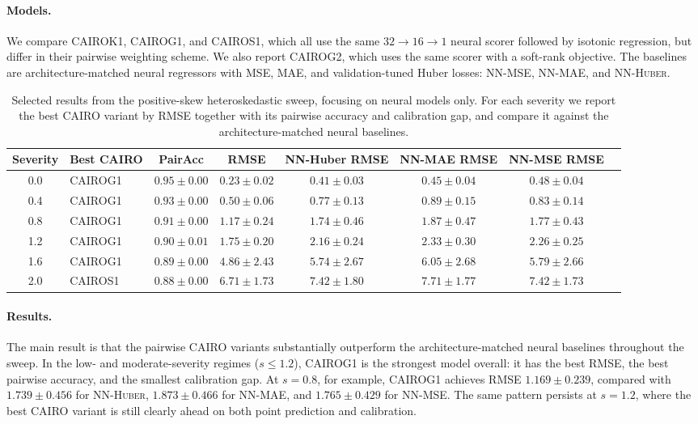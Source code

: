 \documentclass[11pt]{article}
\theoremstyle{plain}
\theoremstyle{plain}
\theoremstyle{plain}
\theoremstyle{plain}
\theoremstyle{plain}
\theoremstyle{plain}
\theoremstyle{plain}
\begin{document}
\paragraph{Models.}
We compare \textsc{CAIROK1}, \textsc{CAIROG1}, and \textsc{CAIROS1}, which all use the same \(32 \rightarrow 16 \rightarrow 1\) neural scorer followed by isotonic regression, but differ in their pairwise weighting scheme. We also report \textsc{CAIROG2}, which uses the same scorer with a soft-rank objective. The baselines are architecture-matched neural regressors with MSE, MAE, and validation-tuned Huber losses: \textsc{NN-MSE}, \textsc{NN-MAE}, and \textsc{NN-Huber}.

\begin{table}[t]
\centering
\small
\caption{Selected results from the positive-skew heteroskedastic sweep, focusing on neural models only. For each severity we report the best CAIRO variant by RMSE together with its pairwise accuracy and calibration gap, and compare it against the architecture-matched neural baselines.}
\label{tab:positive-skew-neural}
\begin{tabular}{c l c c c c c c}
\toprule
Severity & Best CAIRO & PairAcc & RMSE & NN-Huber RMSE & NN-MAE RMSE & NN-MSE RMSE \\
\midrule
0.0 & \textsc{CAIROG1} & $0.95 \pm 0.00$ & $0.23 \pm 0.02$ & $0.41 \pm 0.03$ & $0.45 \pm 0.04$ & $0.48 \pm 0.04$ \\
0.4 & \textsc{CAIROG1} & $0.93 \pm 0.00$ & $0.50 \pm 0.06$ & $0.77 \pm 0.13$ & $0.89 \pm 0.15$ & $0.83 \pm 0.14$ \\
0.8 & \textsc{CAIROG1} & $0.91 \pm 0.00$ & $1.17 \pm 0.24$ & $1.74 \pm 0.46$ & $1.87 \pm 0.47$ & $1.77 \pm 0.43$ \\
1.2 & \textsc{CAIROG1} & $0.90 \pm 0.01$ & $1.75 \pm 0.20$ & $2.16 \pm 0.24$ & $2.33 \pm 0.30$ & $2.26 \pm 0.25$ \\
1.6 & \textsc{CAIROG1} & $0.89 \pm 0.00$ & $4.86 \pm 2.43$ & $5.74 \pm 2.67$ & $6.05 \pm 2.68$ & $5.79 \pm 2.66$ \\
2.0 & \textsc{CAIROS1} & $0.88 \pm 0.00$ & $6.71 \pm 1.73$ & $7.42 \pm 1.80$ & $7.71 \pm 1.77$ & $7.42 \pm 1.73$ \\
\bottomrule
\end{tabular}
\end{table}

\paragraph{Results.}
The main result is that the pairwise CAIRO variants substantially outperform the architecture-matched neural baselines throughout the sweep. In the low- and moderate-severity regimes (\(s \le 1.2\)), \textsc{CAIROG1} is the strongest model overall: it has the best RMSE, the best pairwise accuracy, and the smallest calibration gap. At \(s=0.8\), for example, \textsc{CAIROG1} achieves RMSE \(1.169 \pm 0.239\), compared with \(1.739 \pm 0.456\) for \textsc{NN-Huber}, \(1.873 \pm 0.466\) for \textsc{NN-MAE}, and \(1.765 \pm 0.429\) for \textsc{NN-MSE}. The same pattern persists at \(s=1.2\), where the best CAIRO variant is still clearly ahead on both point prediction and calibration.
\end{document}
